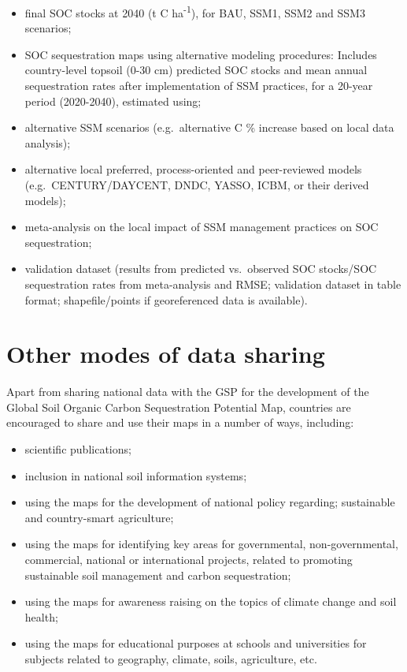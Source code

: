 \documentclass[
  10pt,
  b5paper,
]{book}
\providecommand{\tightlist}{%
  \setlength{\itemsep}{0pt}\setlength{\parskip}{0pt}}
\begin{document}
\begin{itemize}
\tightlist
\item
  final SOC stocks at 2040 (t C ha\textsuperscript{-1}), for BAU, SSM1, SSM2 and SSM3 scenarios;
\item
  SOC sequestration maps using alternative modeling procedures: Includes country-level topsoil (0-30 cm) predicted SOC stocks and mean annual sequestration rates after implementation of SSM practices, for a 20-year period (2020-2040), estimated using;
\item
  alternative SSM scenarios (e.g.~alternative C \% increase based on local data analysis);
\item
  alternative local preferred, process-oriented and peer-reviewed models (e.g.~CENTURY/DAYCENT, DNDC, YASSO, ICBM, or their derived models);
\item
  meta-analysis on the local impact of SSM management practices on SOC sequestration;
\item
  validation dataset (results from predicted vs.~observed SOC stocks/SOC sequestration rates from meta-analysis and RMSE; validation dataset in table format; shapefile/points if georeferenced data is available).
\end{itemize}

\hypertarget{other-modes-of-data-sharing}{%
\section{Other modes of data sharing}\label{other-modes-of-data-sharing}}

Apart from sharing national data with the GSP for the development of the Global Soil Organic Carbon Sequestration Potential Map, countries are encouraged to share and use their maps in a number of ways, including:

\begin{itemize}
\tightlist
\item
  scientific publications;
\item
  inclusion in national soil information systems;
\item
  using the maps for the development of national policy regarding; sustainable and country-smart agriculture;
\item
  using the maps for identifying key areas for governmental, non-governmental, commercial, national or international projects, related to promoting sustainable soil management and carbon sequestration;
\item
  using the maps for awareness raising on the topics of climate change and soil health;
\item
  using the maps for educational purposes at schools and universities for subjects related to geography, climate, soils, agriculture, etc.
\end{itemize}
\end{document}
